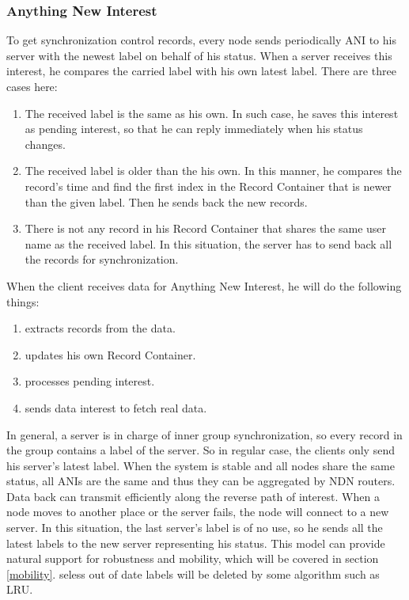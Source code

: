 \documentclass[conference]{IEEEtran}
\begin{document}
\subsubsection{Anything New Interest}
To get synchronization control records,
every node sends periodically ANI to his server with the newest label on behalf of his status.
When a server receives this interest,
he compares the carried label with his own latest label. There are three cases here:
\begin{enumerate}{}
	\item The received label is the same as his own.
In such case, he saves this interest as pending interest,
so that he can reply immediately when his status changes.
	\item The received label is older than the his own.
In this manner, he compares the record's time and find the first index
in the Record Container that is newer than the given label.
Then he sends back the new records.
	\item There is not any record in his Record Container
that shares the same user name as the received label.
In this situation, the server has to send back all the records for synchronization.
\end{enumerate}
When the client receives data for Anything New Interest, he will do the following things:
\begin{enumerate}{}
	\item extracts records from the data.
	\item updates his own Record Container.
	\item processes pending interest.
	\item sends data interest to fetch real data.
\end{enumerate}

In general, a server is in charge of inner group synchronization,
so every record in the group contains a label of the server.
So in regular case, the clients only send his server's latest label.
When the system is stable and all nodes share the same status,
all ANIs are the same and thus they can be aggregated by NDN routers.
Data back can transmit efficiently along the reverse path of interest.
When a node moves to another place or the server fails, the node will connect to a new server.
In this situation, the last server's label is of no use,
so he sends all the latest labels to the new server representing his status.
This model can provide natural support for robustness and mobility,
which will be covered in section \ref{mobility}.
seless out of date labels will be deleted by some algorithm such as LRU.
\end{document}
